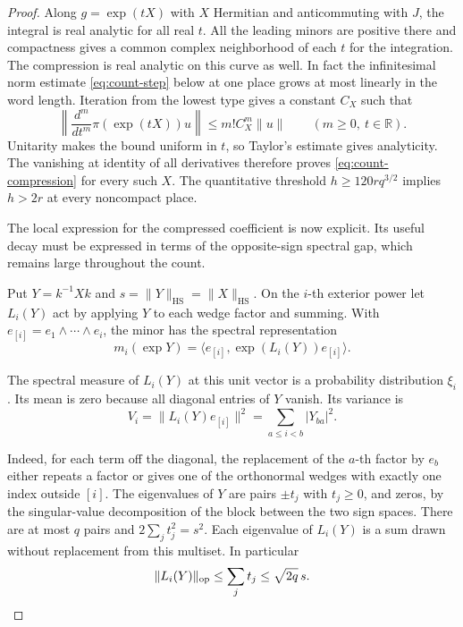 \begin{proof}
Along \(g=\exp(tX)\) with \(X\) Hermitian and anticommuting with
\(J\), the integral is real analytic for all real \(t\). All the
leading minors are positive there and compactness gives a common
complex neighborhood of each \(t\) for the integration. The
compression is real analytic on this curve as well. In fact the
infinitesimal norm estimate \eqref{eq:count-step} below at one
place grows at most linearly in the word length. Iteration from the lowest type gives a constant \(C_X\) such that
\[
 \left\|\frac{d^m}{dt^m}\pi(\exp(tX))u\right\|
       \le m! C_X^m\|u\|\qquad (m\ge0,\ t\in\mathbb R).
\]
Unitarity makes the bound uniform in \(t\), so Taylor's estimate
gives analyticity. The vanishing
at identity of all derivatives therefore proves
\eqref{eq:count-compression} for every such \(X\). The quantitative threshold \(h\ge120rq^{3/2}\) implies
\(h>2r\) at every noncompact place.


The local expression for the compressed coefficient is now explicit. Its useful decay must be expressed in terms of the opposite-sign spectral gap, which remains large throughout the count.


Put \(Y=k^{-1}Xk\) and \(s=\|Y\|_{\mathrm{HS}}=\|X\|_{\mathrm{HS}}\).
On the \(i\)-th exterior power let \(L_i(Y)\) act by applying
\(Y\) to each wedge factor and summing. With
\(e_{[i]}=e_1\wedge\cdots\wedge e_i\), the minor has the spectral representation
\[
 m_i(\exp Y)=\langle e_{[i]},\exp(L_i(Y))e_{[i]}\rangle.
\]

The spectral measure of \(L_i(Y)\) at this unit vector is a
probability distribution \(\xi_i\). Its mean is zero because all
diagonal entries of \(Y\) vanish. Its variance is
\[
   V_i=\|L_i(Y)e_{[i]}\|^2=\sum_{a\le i<b}|Y_{ba}|^2.
\]

Indeed, for each term off the diagonal, the replacement of the
\(a\)-th factor by \(e_b\) either repeats a factor or gives one of
the orthonormal wedges with exactly one index outside \([i]\).
The eigenvalues of \(Y\) are pairs \(\pm t_j\) with \(t_j\ge0\),
and zeros, by the singular-value decomposition of the block between
the two sign spaces. There are at most \(q\) pairs and
\(2\sum_j t_j^2=s^2\). Each eigenvalue of \(L_i(Y)\) is a sum drawn without replacement
from this multiset. In particular
\[
              \|L_i(Y)\|_{\rm op}\le \sum_j t_j\le\sqrt{2q}\,s .
\]


\end{proof}

